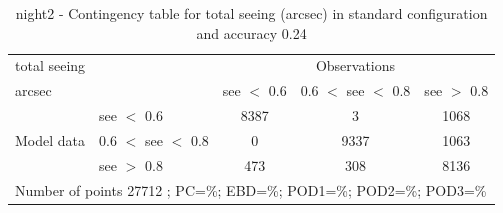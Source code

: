 \begin{table}[p!]
\begin{center}
\begin{tabular}{llccc}
\hline
{total seeing}                                       &                                                    & \multicolumn{3}{c}{Observations}                 \\
{arcsec}                                       &                             & see $<$ 0.6   & 0.6 $<$ see $<$ 0.8 & see $>$ 0.8 \\
\hline
\multicolumn{1}{c}{\multirow{3}{*}{Model data}}  & see $<$ 0.6             & 8387                & 3                       & 1068              \\
                                                 & 0.6  $<$ see $<$ 0.8 & 0                & 9337                       & 1063              \\
                                                 & see $>$ 0.8             & 473                & 308                       & 8136              \\
\hline
\multicolumn{5}{l}{ Number of points        27712 ; PC=\%; EBD=\%; POD1=\%; POD2=\%; POD3=\%}
\end{tabular}
\end{center}
\caption{night2 - Contingency table for  total seeing (arcsec) in standard configuration and accuracy 0.24}
\label{tab:contingencyseeBEF:night2}
\end{table}
